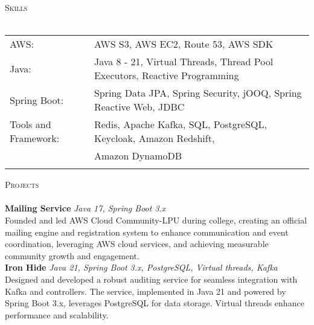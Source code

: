 \documentclass[a4paper]{article}
\newcommand{\lineunder} {
    \vspace*{-8pt} \\
    \hspace*{-18pt} \hrulefill \\
}
\newcommand{\header} [1] {
    {\hspace*{-18pt}\vspace*{6pt} \textsc{#1}}
    \vspace*{-6pt} \lineunder
}
\begin{document}
\header{Skills}
\begin{tabular}{ l l }
	AWS:                  & AWS S3, AWS EC2, Route 53, AWS SDK                                            \\
	Java:                 & Java 8 - 21, Virtual Threads, Thread Pool Executors, Reactive Programming \\
	Spring Boot:          & Spring Data JPA, Spring Security, jOOQ, Spring Reactive Web, JDBC         \\
    Tools and Framework:   & Redis, Apache Kafka, SQL, PostgreSQL, Keycloak, Amazon Redshift, \\& Amazon DynamoDB \\         \\
\end{tabular}
\vspace{2mm}

\header{Projects}
{\textbf{Mailing Service}} {\sl Java 17, Spring Boot 3.x} \hfill \href{https://github.com/AWS-Cloud-Community-LPU/mailing-service}{\faGithub}\\
Founded and led AWS Cloud Community-LPU during college, creating an official mailing engine and registration system to enhance communication and event coordination, leveraging AWS cloud services, and achieving measurable community growth and engagement.\\
\vspace*{2mm}
{\textbf{Iron Hide}} {\sl Java 21, Spring Boot 3.x, PostgreSQL, Virtual threads, Kafka} \hfill \href{https://github.com/garvit-joshi/ironhide}{\faGithub}\\
Designed and developed a robust auditing service for seamless integration with Kafka and controllers. The service, implemented in Java 21 and powered by Spring Boot 3.x, leverages PostgreSQL for data storage. Virtual threads enhance performance and scalability.\\
\vspace*{2mm}
\ 
\end{document}
